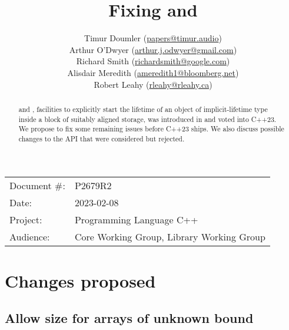 
\usepackage{listings}

\newcommand{\forceindent}{\parindent=1em\indent\parindent=0pt\relax} %


\title{Fixing \mbox{} and \mbox{}}
\author{
  Timur Doumler \small(\href{mailto:papers@timur.audio}{papers@timur.audio}) \\
  Arthur O'Dwyer \small(\href{mailto:arthur.j.odwyer@gmail.com}{arthur.j.odwyer@gmail.com}) \\
  Richard Smith \small(\href{mailto:richardsmith@google.com}{richardsmith@google.com}) \\
  Alisdair Meredith \small(\href{mailto:ameredith1@bloomberg.net}{ameredith1@bloomberg.net}) \\
  Robert Leahy \small(\href{mailto:rleahy@rleahy.ca}{rleahy@rleahy.ca})
}
\date{}
\maketitle

\begin{tabular}{ll}
Document \#: & P2679R2 \\
Date: & 2023-02-08\\
Project: & Programming Language C++ \\
Audience: & Core Working Group, Library Working Group
\end{tabular}


\begin{abstract}
\mbox{} and \mbox{}, facilities to explicitly start the lifetime of an object of implicit-lifetime type inside a block of suitably aligned storage, was introduced in \cite{P2590R2} and voted into C++23. We propose to fix some remaining issues before C++23 ships. We also discuss possible changes to the API that were considered but rejected.
\end{abstract}

\section{Changes proposed}

\subsection{Allow size  for arrays of unknown bound}

